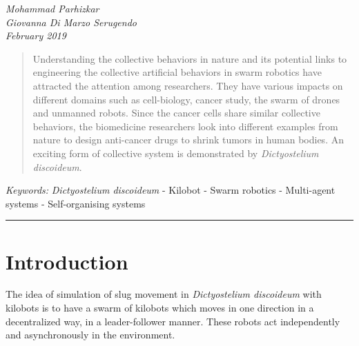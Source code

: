\documentclass[11pt,a4paper]{article}
\begin{document}
\begin{center}
{ }
\vspace{2mm}

{\selectfont\textit{Mohammad Parhizkar \\ Giovanna Di Marzo Serugendo \\ \tiny{February 2019} }}


\end{center}
\begin{abstract}
Understanding the collective behaviors in nature and its potential links to engineering the collective artificial behaviors in swarm robotics have attracted the attention among researchers. They have various impacts on different domains such as cell-biology, cancer study, the swarm of drones and unmanned robots. Since the cancer cells share similar collective behaviors, the biomedicine researchers look into different examples from nature to design anti-cancer drugs to shrink tumors in human bodies. An exciting form of collective system is demonstrated by {\textit{Dictyostelium discoideum}}. 

   \end{abstract}

{\footnotesize\textit{Keywords:} {\textit{Dictyostelium discoideum}} - Kilobot - Swarm robotics - Multi-agent systems - Self-organising systems}

{\begin{center}\noindent\rule{14cm}{0.4pt}\end{center}}
\section{Introduction}
The idea of simulation of slug movement in \textit{Dictyostelium discoideum} with kilobots is to have a swarm of kilobots which moves in one direction in a decentralized way, in a leader-follower manner. These robots act independently and asynchronously in the environment. 
\end{document}
